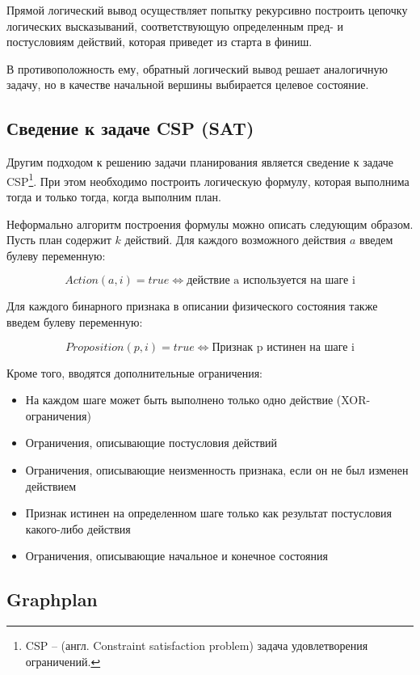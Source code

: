 Прямой логический вывод осуществляет попытку рекурсивно построить цепочку логических высказываний, соответствующую определенным пред- и постусловиям действий, которая приведет из старта в финиш.

В противоположность ему, обратный логический вывод решает аналогичную задачу, но в качестве начальной вершины выбирается целевое состояние.

\subsection{Сведение к задаче CSP (SAT)}

Другим подходом к решению задачи планирования является сведение к задаче CSP\footnote{CSP -- (англ. Constraint satisfaction problem) задача удовлетворения ограничений. }. При этом необходимо построить логическую формулу, которая выполнима тогда и только тогда, когда выполним план.

Неформально алгоритм построения формулы можно описать следующим образом. Пусть план содержит $k$ действий. Для каждого возможного действия $a$ введем булеву переменную:

\begin{equation}
 Action(a, i) = true \iff \text{действие a используется на шаге i}
\end{equation}

Для каждого бинарного признака в описании физического состояния также введем булеву переменную:

\begin{equation}
 Proposition(p, i) = true \iff \text{Признак p истинен на шаге i}
\end{equation}

Кроме того, вводятся дополнительные ограничения:
\begin{itemize}
 \item На каждом шаге может быть выполнено только одно действие (XOR-ограничения)
 \item Ограничения, описывающие постусловия действий
 \item Ограничения, описывающие неизменность признака, если он не был изменен действием
 \item Признак истинен на определенном шаге только как результат постусловия какого-либо действия
 \item Ограничения, описывающие начальное и конечное состояния
\end{itemize}

\subsection{Graphplan}


